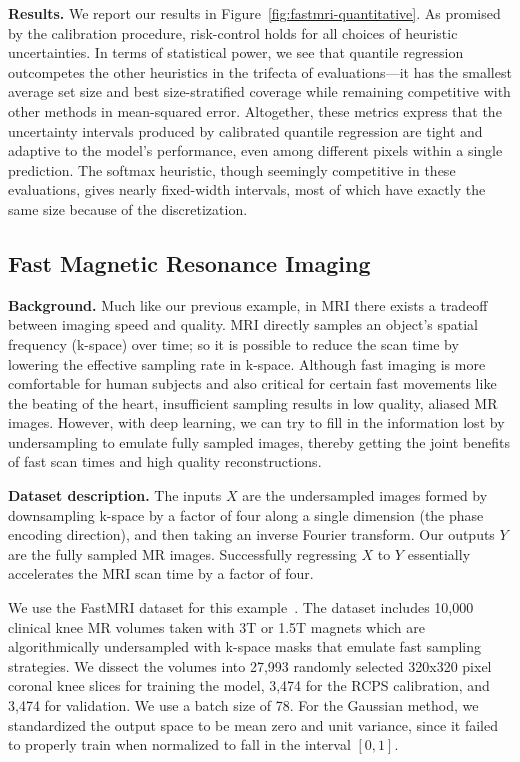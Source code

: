 \documentclass[10pt]{article}
\begin{document}
\noindent\textbf{Results.} We report our results in Figure~\ref{fig:fastmri-quantitative}.
As promised by the calibration procedure, risk-control holds for all choices of heuristic uncertainties. 
In terms of statistical power, we see that quantile regression outcompetes the other heuristics in the trifecta of evaluations---it has the smallest average set size and best size-stratified coverage while remaining competitive with other methods in mean-squared error.
Altogether, these metrics express that the uncertainty intervals produced by calibrated quantile regression are tight and adaptive to the model's performance, even among different pixels within a single prediction.
The softmax heuristic, though seemingly competitive in these evaluations, gives nearly fixed-width intervals, most of which have exactly the same size because of the discretization.

\subsection{Fast Magnetic Resonance Imaging}
\label{subsec:fastmri}
\noindent\textbf{Background.} Much like our previous example, in MRI there exists a tradeoff between imaging speed and quality. 
MRI directly samples an object's spatial frequency (k-space) over time; so it is possible to reduce the scan time by lowering the effective sampling rate in k-space.
Although fast imaging is more comfortable for human subjects and also critical for certain fast movements like the beating of the heart, insufficient sampling results in low quality, aliased MR images. 
However, with deep learning, we can try to fill in the information lost by undersampling to emulate fully sampled images, thereby getting the joint benefits of fast scan times and high quality reconstructions.

\noindent\textbf{Dataset description.} The inputs $X$ are the undersampled images formed by downsampling k-space by a factor of four along a single dimension (the phase encoding direction), and then taking an inverse Fourier transform.
Our outputs $Y$ are the fully sampled MR images. Successfully regressing $X$ to $Y$ essentially accelerates the MRI scan time by a factor of four.

We use the FastMRI dataset for this example~\cite{zbontar2018fastmri}.
The dataset includes 10,000 clinical knee MR volumes taken with 3T or 1.5T magnets which are algorithmically undersampled with k-space masks that emulate fast sampling strategies.
We dissect the volumes into 27,993 randomly selected 320x320 pixel coronal knee slices for training the model, 3,474 for the RCPS calibration, and 3,474 for validation.
We use a batch size of 78.
For the Gaussian method, we standardized the output space to be mean zero and unit variance, since it failed to properly train when normalized to fall in the interval $[0,1]$.
\end{document}
